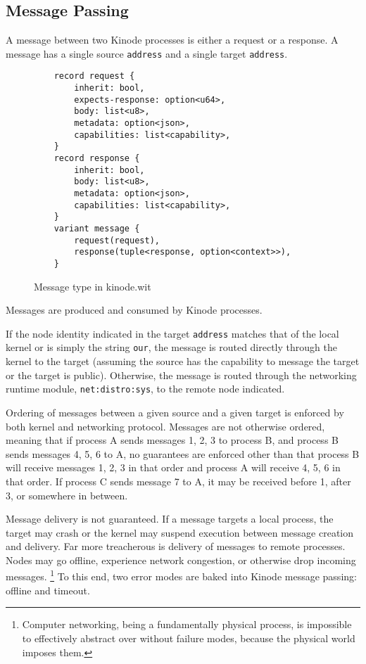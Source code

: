 \documentclass[runningheads]{llncs}
\begin{document}
\subsection{Message Passing}
\label{sec:osmessagepassing}

A message between two Kinode processes is either a request or a response.
A message has a single source \verb|address| and a single target \verb|address|.

\begin{figure}[H]
    \centering
    \begin{verbatim}
    record request {
        inherit: bool,
        expects-response: option<u64>,
        body: list<u8>,
        metadata: option<json>,
        capabilities: list<capability>,
    }
    record response {
        inherit: bool,
        body: list<u8>,
        metadata: option<json>,
        capabilities: list<capability>,
    }
    variant message {
        request(request),
        response(tuple<response, option<context>>),
    }
    \end{verbatim}
    \caption{Message type in kinode.wit}
    \label{fig:WIT Types 2}
\end{figure}

Messages are produced and consumed by Kinode processes.

If the node identity indicated in the target \verb|address| matches that of the local kernel or is simply the string \verb|our|, the message is routed directly through the kernel to the target (assuming the source has the capability to message the target or the target is public).
Otherwise, the message is routed through the networking runtime module, \verb|net:distro:sys|, to the remote node indicated.

Ordering of messages between a given source and a given target is enforced by both kernel and networking protocol.
Messages are not otherwise ordered, meaning that if process A sends messages 1, 2, 3 to process B, and process B sends messages 4, 5, 6 to A, no guarantees are enforced other than that process B will receive messages 1, 2, 3 in that order and process A will receive 4, 5, 6 in that order.
If process C sends message 7 to A, it may be received before 1, after 3, or somewhere in between.

Message delivery is not guaranteed.
If a message targets a local process, the target may crash or the kernel may suspend execution between message creation and delivery.
Far more treacherous is delivery of messages to remote processes.
Nodes may go offline, experience network congestion, or otherwise drop incoming messages.
\footnote{Computer networking, being a fundamentally physical process, is impossible to effectively abstract over without failure modes, because the physical world imposes them.}
To this end, two error modes are baked into Kinode message passing: offline and timeout.
\end{document}
